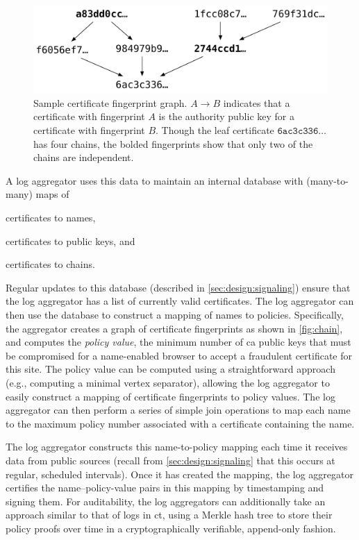 \begin{figure}
  \centering
  \includegraphics[width=0.85\linewidth]{fig/chain}
  \vspace{-3mm}
  \caption{Sample certificate fingerprint graph. $A \rightarrow B$ indicates
    that a certificate with fingerprint $A$ is the authority public key for a
    certificate with fingerprint $B$. Though the leaf certificate
    $\texttt{6ac3c336}\ldots$ has four chains, the bolded fingerprints show that
    only two of the chains are independent.}
  \label{fig:chain}
  \vspace{-3mm}
\end{figure}

A log aggregator uses this data to maintain an internal database with
(many-to-many) maps of
\begin{inparaenum}
\item certificates to names,
\item certificates to public keys, and
\item certificates to chains.
\end{inparaenum}
Regular updates to this database (described in \autoref{sec:design:signaling})
ensure that the log aggregator has a list of currently valid certificates. The
log aggregator can then use the database to construct a mapping of names to
policies. Specifically, the aggregator creates a graph of certificate
fingerprints as shown in \autoref{fig:chain}, and computes the \emph{policy
value}, the minimum number of \ac{ca} public keys that must be compromised for a
\ac{name}-enabled browser to accept a fraudulent certificate for this site. The
policy value can be computed using a straightforward approach (e.g., computing a
minimal vertex separator), allowing the log aggregator to easily construct a
mapping of certificate fingerprints to policy values. The log aggregator can
then perform a series of simple join operations to map each name to the maximum
policy number associated with a certificate containing the name.

The log aggregator constructs this name-to-policy mapping each time it receives
data from public sources (recall from \autoref{sec:design:signaling} that this
occurs at regular, scheduled intervals). Once it has created the mapping, the
log aggregator certifies the name--policy-value pairs in this mapping by
timestamping and signing them. For auditability, the log aggregators
can additionally take an approach similar to that of logs in \ac{ct}, using a
Merkle hash tree to store their policy proofs over time in a cryptographically
verifiable, append-only fashion.

